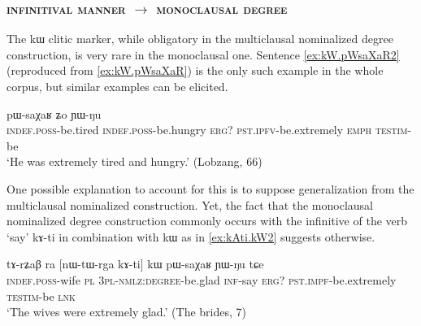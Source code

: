 \documentclass[oldfontcommands,oneside,a4paper,11pt]{article}
\newcommand{\ipa}[1]{{\phon #1}} %
\begin{document}
%
%
%
 
 
 \subsubsection{ \textsc{infinitival manner} $\rightarrow$  \textsc{monoclausal degree}} \label{sec:manner2adj}
The  \ipa{kɯ} clitic marker, while obligatory in the multiclausal nominalized degree construction, is very rare in the monoclausal one. Sentence \ref{ex:kW.pWsaXaR2}  (reproduced from \ref{ex:kW.pWsaXaR}) is the only such example in the whole corpus, but similar examples can be elicited.

      \begin{exe}
  \ex  \label{ex:kW.pWsaXaR2}  
  \gll 
   [\ipa{tɤ-ɣɲat}  	\ipa{tɤ-mtsɯr}]  	\ipa{kɯ}  	\ipa{pɯ-saχaʁ}  	\ipa{ʑo}  	\ipa{ɲɯ-ŋu}  \\
      \textsc{indef.poss}-be.tired     \textsc{indef.poss}-be.hungry \textsc{erg?} \textsc{pst.ipfv}-be.extremely \textsc{emph} \textsc{testim}-be \\
      \glt `He was extremely tired and hungry.' (Lobzang, 66)
   \end{exe} 

One possible explanation to account for this is to suppose generalization from the multiclausal nominalized construction. Yet, the fact that the monoclausal nominalized degree construction commonly occurs with the infinitive of the verb `say' \ipa{kɤ-ti} in combination with   \ipa{kɯ} as in \ref{ex:kAti.kW2}  suggests otherwise.
      \begin{exe}
  \ex  \label{ex:kAti.kW2}  
  \gll 
\ipa{tɤ-rʑaβ} 	\ipa{ra} 	 	[\ipa{nɯ-tɯ-rga} 	\ipa{kɤ-ti}] 	\ipa{kɯ} 	\ipa{pɯ-saχaʁ} 	\ipa{ɲɯ-ŋu} 	\ipa{tɕe} \\
\textsc{indef.poss}-wife \textsc{pl} \textsc{3pl-nmlz:degree}-be.glad \textsc{inf}-say \textsc{erg?} \textsc{pst.impf}-be.extremely \textsc{testim}-be \textsc{lnk} \\
\glt `The wives were extremely glad.' (The brides, 7)
   \end{exe} 
   
\end{document}
